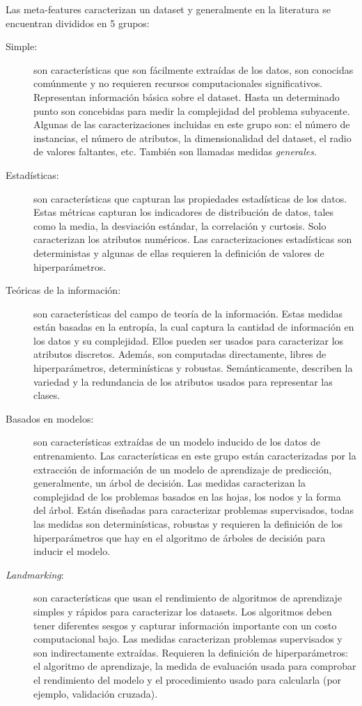 Las meta-features caracterizan un dataset y generalmente en la literatura se encuentran divididos en 5 grupos:

\begin{description}
	\item[Simple:] son características que son fácilmente extraídas de los datos, son conocidas comúnmente y no requieren recursos computacionales significativos. Representan información básica sobre el dataset. Hasta un determinado punto son concebidas para medir la complejidad del problema subyacente. Algunas de las caracterizaciones incluidas en este grupo son: el número de instancias, el número de atributos, la dimensionalidad del dataset, el radio de valores faltantes, etc. También son llamadas medidas \textit{generales}.
	
	\item[Estadísticas:] son características que capturan las propiedades estadísticas de los datos. Estas métricas capturan los indicadores de distribución de datos, tales como la media, la desviación estándar, la correlación y curtosis. Solo caracterizan los atributos numéricos. Las caracterizaciones estadísticas son deterministas y algunas de ellas requieren la definición de valores de hiperparámetros. %
	
	\item[Teóricas de la información:] son características del campo de teoría de la información. Estas medidas están basadas en la entropía, la cual captura la cantidad de información en los datos y su complejidad. Ellos pueden ser usados para caracterizar los atributos discretos. Además, son computadas directamente, libres de hiperparámetros, determinísticas y robustas. Semánticamente, describen la variedad y la redundancia de los atributos usados para representar las clases.
	
	\item[Basados en modelos:] son características extraídas de un modelo inducido de los datos de entrenamiento. Las características en este grupo están caracterizadas por la extracción de información de un modelo de aprendizaje de predicción, generalmente, un árbol de decisión. Las medidas caracterizan la complejidad de los problemas basados en las hojas, los nodos y la forma del árbol. Están diseñadas para caracterizar problemas supervisados, todas las medidas son determinísticas, robustas y requieren la definición de los hiperparámetros que hay en el algoritmo de árboles de decisión para inducir el modelo.
	
	\item[\textit{Landmarking}:] son características que usan el rendimiento de algoritmos de aprendizaje simples y rápidos para caracterizar los datasets. Los algoritmos deben tener diferentes sesgos y capturar información importante con un costo computacional bajo. Las medidas caracterizan problemas supervisados y son indirectamente extraídas. Requieren la definición de hiperparámetros: el algoritmo de aprendizaje, la medida de evaluación usada para comprobar el rendimiento del modelo y el procedimiento usado para calcularla (por ejemplo, validación cruzada).
\end{description}

